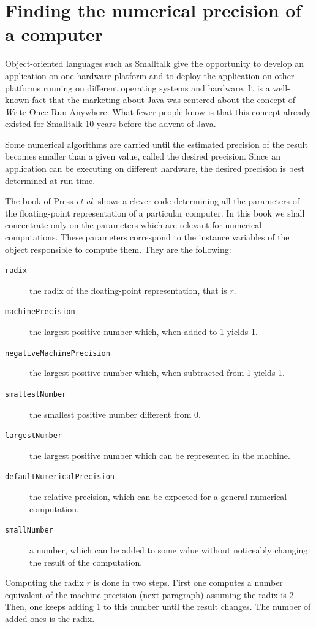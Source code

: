 \section{Finding the numerical precision of a computer}
\label{sec:findprecision}
Object-oriented languages such as Smalltalk give the
opportunity to develop an application on one hardware platform and
to deploy the application on other platforms running on different
operating systems and hardware.
It is a well-known fact that the
marketing about Java was centered about the concept of {\textsl Write
Once Run Anywhere}.
What fewer people know is that this concept
already existed for Smalltalk 10 years before the advent of Java.

Some numerical algorithms are carried until the estimated
precision of the result becomes smaller than a given value, called
the desired precision. Since an application can be executing on
different hardware, the desired precision is best determined at
run time.

The book of Press \textit{et al.} \cite{Press} shows a clever code
determining all the parameters of the floating-point
representation of a particular computer. In this book we shall
concentrate only on the parameters which are relevant for
numerical computations. These parameters correspond to the
instance variables of the object responsible to compute them. They
are the following:
\begin{description}
\item[\texttt{radix}] the radix of the floating-point representation, that is $r$.
\item[\texttt{machinePrecision}] the largest positive number which, when added to 1 yields 1.
\item[\texttt{negativeMachinePrecision}] the largest positive number which, when subtracted from 1 yields 1.
\item[\texttt{smallestNumber}] the smallest positive number different from 0.
\item[\texttt{largestNumber}] the largest positive number which can be represented in the machine.
\item[\texttt{defaultNumericalPrecision}] the relative precision, which can be expected for a general numerical computation.
\item[\texttt{smallNumber}] a number, which can be added to some value without noticeably changing the result of the computation.
\end{description}
Computing the radix $r$ is done in two steps. First one computes a
number equivalent of the machine precision (\cf next paragraph)
assuming the radix is 2. Then, one keeps adding 1 to this number
until the result changes. The number of added ones is the radix.


